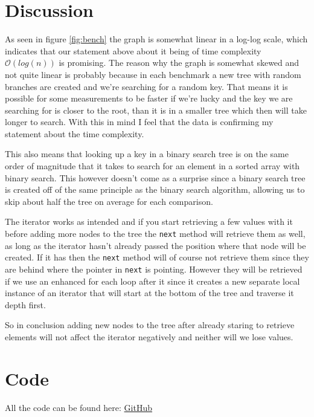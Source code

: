 \documentclass[a4paper,11pt]{article}
\begin{document}
\section{Discussion}
As seen in figure \ref{fig:bench} the graph is somewhat linear in a log-log scale, which
indicates that our statement above about it being of time complexity $\mathcal{O}(log(n))$
is promising. The reason why the graph is somewhat skewed and not quite linear is
probably because in each benchmark a new tree with random branches are created and
we're searching for a random key. That means it is possible for some measurements to be
faster if we're lucky and the key we are searching for is closer to the root, than it
is in a smaller tree which then will take longer to search. With this in mind I feel
that the data is confirming my statement about the time complexity.

This also means that looking up a key in a binary search tree is on the same order of magnitude
that it takes to search for an element in a sorted array with binary search. This however 
doesn't come as a surprise since a binary search tree is created off of the same principle as 
the binary search algorithm, allowing us to skip about half the tree on average for each comparison.

The iterator works as intended and if you start retrieving a few values with it before adding more nodes
to the tree the {\tt next} method will retrieve them as well, as long as the iterator hasn't already passed 
the position where that node will be created. If it has then the {\tt next} method will of course not retrieve
them since they are behind where the pointer in {\tt next} is pointing. However they will be retrieved if we use
an enhanced for each loop after it since it creates a new separate local instance of an iterator that will start at the 
bottom of the tree and traverse it depth first.

So in conclusion adding new nodes to the tree after already staring to retrieve elements will not affect the iterator 
negatively and neither will we lose values. 

\newpage
\FloatBarrier
\section*{Code}
All the code can be found here: \href{https://github.com/adrian-jonsson-sjoedin/ID1021-AlgoData/tree/main/Tasks/Trees/src}{GitHub}
\end{document}
